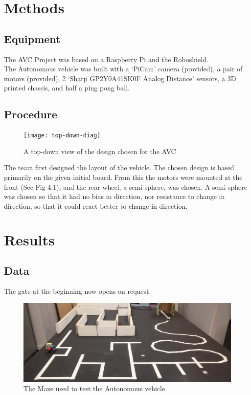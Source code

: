 \documentclass[paper=a4, fontsize=11pt]{scrartcl} %
\numberwithin{equation}{section} %
\numberwithin{figure}{section} %
\begin{document}
\section{Methods}
\subsection{Equipment}
The AVC Project was based on a Raspberry Pi and the Roboshield.\\
The Autonomous vehicle was built with a `PiCam' camera (provided), a pair of
motors (provided), 2 `Sharp GP2Y0A41SK0F Analog Distance' sensors, a 3D printed
chassis, and half a ping pong ball.
\subsection{Procedure}
\begin{figure}
  \begin{center}
    \texttt{[image: top-down-diag]}
    \caption{A top-down view of the design chosen for the AVC}
  \end{center}
\end{figure}
The team first designed the layout of the vehicle. The chosen design is based
primarily on the given initial board. From this the motors were mounted at the
front (See Fig 4.1), and the rear wheel, a semi-sphere, was chosen. A
semi-sphere was chosen so that it had no bias in direction, nor resistance to
change in direction, so that it could react better to change in direction.\\

\section{Results}
\subsection{Data}
The gate at the beginning now opens on request.
\begin{figure}[h]
  \includegraphics[width=\textwidth]{maze}
  \centering
  \caption{The Maze used to test the Autonomous vehicle}
\end{figure}
\end{document}
